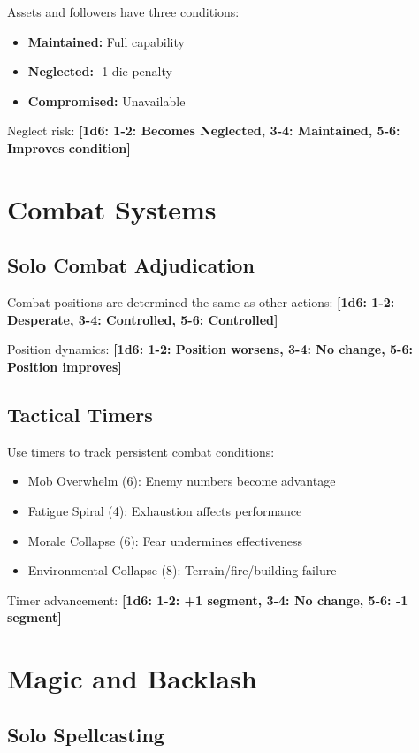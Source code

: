 \documentclass[11pt]{article}
\newcommand{\dice}[1]{\textbf{[1d6: #1]}}
\begin{document}
Assets and followers have three conditions:
\begin{itemize}
    \item \textbf{Maintained:} Full capability
    \item \textbf{Neglected:} -1 die penalty
    \item \textbf{Compromised:} Unavailable
\end{itemize}

Neglect risk:
\dice{1-2: Becomes Neglected, 3-4: Maintained, 5-6: Improves condition}

\section{Combat Systems}

\subsection{Solo Combat Adjudication}

Combat positions are determined the same as other actions:
\dice{1-2: Desperate, 3-4: Controlled, 5-6: Controlled}

Position dynamics:
\dice{1-2: Position worsens, 3-4: No change, 5-6: Position improves}

\subsection{Tactical Timers}

Use timers to track persistent combat conditions:
\begin{itemize}
    \item Mob Overwhelm (6): Enemy numbers become advantage
    \item Fatigue Spiral (4): Exhaustion affects performance
    \item Morale Collapse (6): Fear undermines effectiveness
    \item Environmental Collapse (8): Terrain/fire/building failure
\end{itemize}

Timer advancement:
\dice{1-2: +1 segment, 3-4: No change, 5-6: -1 segment}

\section{Magic and Backlash}

\subsection{Solo Spellcasting}
\end{document}
